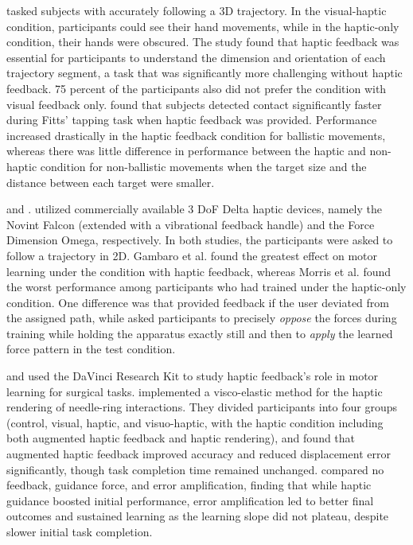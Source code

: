 \cite{Rodriguez2010} tasked subjects with accurately following a 3D trajectory. In the visual-haptic condition, participants could see their hand movements, while in the haptic-only condition, their hands were obscured. The study found that haptic feedback was essential for participants to understand the dimension and orientation of each trajectory segment, a task that was significantly more challenging without haptic feedback. 75 percent of the participants also did not prefer the condition with visual feedback only. 
\cite{Wall2000} found that subjects detected contact significantly faster during Fitts' tapping task when haptic feedback was provided. Performance increased drastically in the haptic feedback condition for ballistic movements, whereas there was little difference in performance between the haptic and non-haptic condition for non-ballistic movements when the target size and the distance between each target were smaller.

\cite{Gambaro2014} and \cite{Morris2007}. utilized commercially available 3 DoF Delta haptic devices, namely the Novint Falcon (extended with a vibrational feedback handle) and the Force Dimension Omega, respectively. In both studies, the participants were asked to follow a trajectory in 2D. Gambaro et al. found the greatest effect on motor learning under the condition with haptic feedback, whereas Morris et al. found the worst performance among participants who had trained under the haptic-only condition. One difference was that \cite{Gambaro2014} provided feedback if the user deviated from the assigned path, while \cite{Morris2007} asked participants to precisely \textit{oppose} the forces during training while holding the apparatus exactly still and then to \textit{apply} the learned force pattern in the test condition. 


\cite{Caccianiga2021} and \cite{Oquendo2024} used the DaVinci Research Kit to study haptic feedback's role in motor learning for surgical tasks. \cite{Caccianiga2021} implemented a visco-elastic method for the haptic rendering of needle-ring interactions. They divided participants into four groups (control, visual, haptic, and visuo-haptic, with the haptic condition including both augmented haptic feedback and haptic rendering), and found that augmented haptic feedback improved accuracy and reduced displacement error significantly, though task completion time remained unchanged. \cite{Oquendo2024} compared no feedback, guidance force, and error amplification, finding that while haptic guidance boosted initial performance, error amplification led to better final outcomes and sustained learning as the learning slope did not plateau, despite slower initial task completion.


